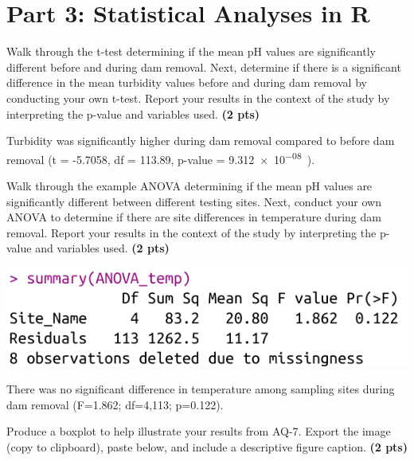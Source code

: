 \documentclass[12pt,letterpaper]{article}
\begin{document}
\section*{Part 3: Statistical Analyses in R}
\begin{enumerate}[font=\bfseries, wide, resume]
    {\color{gray}\item Walk through the t-test determining if the mean pH values are significantly different before and during dam removal. Next, determine if there is a significant difference in the mean turbidity values before and during dam removal by conducting your own t-test. Report your results in the context of the study by interpreting the p-value and variables used. \textbf{(2 pts)}}\par

    Turbidity was significantly higher during dam removal compared to before dam removal (t = -5.7058, df = 113.89, p-value = \SI{9.312e-08}).

    {\color{gray}\item Walk through the example ANOVA determining if the mean pH values are significantly different between different testing sites. Next, conduct your own ANOVA to determine if there are site differences in temperature during dam removal. Report your results in the context of the study by interpreting the p-value and variables used. \textbf{(2 pts)}}
    
    \begin{center}
        \includegraphics[scale=0.5]{images/a2-qst7.png}
    \end{center}

    There was no significant difference in temperature among sampling sites during dam removal (F=1.862; df=4,113; p=0.122).

    {\color{gray}\item Produce a boxplot to help illustrate your results from AQ-7. Export the image (copy to clipboard), paste below, and include a descriptive figure caption. \textbf{(2 pts)}}


\end{enumerate}
\end{document}
